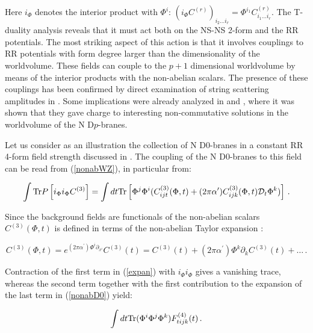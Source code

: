 \documentclass[12pt,a4paper]{article}
\begin{document}
\noindent Here $i_\Phi$ denotes the interior product with $\Phi^i$:
$(i_\Phi C^{(r)})_{i_2\dots i_r}=\Phi^{i_1}
C^{(r)}_{i_1\dots i_r}$. The T-duality
analysis reveals that it must act both on the NS-NS 2-form 
and the RR potentials. 
The most striking aspect of this action is that it involves couplings to 
RR potentials
with form degree larger than the dimensionality of the worldvolume.
These fields can couple to the $p+1$ dimensional worldvolume by
means of the
interior products with the non-abelian scalars. The presence of these
couplings has been confirmed by direct examination of string
scattering amplitudes in \cite{GM2}.
Some implications were already analyzed in \cite{Myers} 
and \cite{CMT}, where it was 
shown that they gave charge to interesting 
non-commutative solutions in the worldvolume of the N D$p$-branes. 

Let us consider as an illustration the collection 
of N D0-branes in a constant RR 4-form field strength discussed
in \cite{Myers}.
The coupling of the N D0-branes to this field can be read from 
(\ref{nonabWZ}), in particular from:

\begin{equation}
\label{nonabD0}
\int {\rm Tr}P\left[i_\Phi i_\Phi C^{(3)}\right]=
\int dt {\rm Tr}\left[\Phi^j \Phi^i (C^{(3)}_{ijt}(\Phi,t)+
(2\pi\alpha^\prime)C^{(3)}_{ijk}(\Phi,t){\cal D}_t\Phi^k)\right]\, .
\end{equation}

\noindent Since the background fields are functionals of the 
non-abelian scalars
$C^{(3)}(\Phi,t)$ is defined in terms of the non-abelian 
Taylor expansion \cite{GM}:

\begin{equation}
\label{expan}
C^{(3)}(\Phi,t)=e^{(2\pi\alpha^\prime)\Phi^i\partial_{x^i}}C^{(3)}(t)=
C^{(3)}(t)+(2\pi\alpha^\prime)\Phi^k\partial_k C^{(3)}(t)+\dots\, .
\end{equation}

\noindent Contraction of the first term in (\ref{expan})
with $i_\Phi i_\Phi$ gives a 
vanishing trace, whereas the second term together with the first 
contribution to
the expansion of the last term in
(\ref{nonabD0}) yield:

\begin{equation}
\int dt {\rm Tr} (\Phi^i \Phi^j \Phi^k)F^{(4)}_{tijk}(t)\, .
\end{equation}
\end{document}
